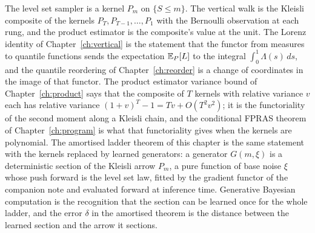 The level set sampler is a kernel $P_m$ on $\{ S \le m \}$. The vertical walk is the Kleisli composite of the kernels $P_T, P_{T-1}, \dots, P_1$ with the Bernoulli observation at each rung, and the product estimator is the composite's value at the unit. The Lorenz identity of Chapter~\ref{ch:vertical} is the statement that the functor from measures to quantile functions sends the expectation $\mathbb{E}_P[L]$ to the integral $\int_0^1 \Lambda(s) \, ds$, and the quantile reordering of Chapter~\ref{ch:reorder} is a change of coordinates in the image of that functor. The product estimator variance bound of Chapter~\ref{ch:product} says that the composite of $T$ kernels with relative variance $v$ each has relative variance $(1 + v)^T - 1 = T v + O(T^2 v^2)$; it is the functoriality of the second moment along a Kleisli chain, and the conditional FPRAS theorem of Chapter~\ref{ch:program} is what that functoriality gives when the kernels are polynomial. The amortised ladder theorem of this chapter is the same statement with the kernels replaced by learned generators: a generator $G(m, \xi)$ is a deterministic section of the Kleisli arrow $P_m$, a pure function of base noise $\xi$ whose push forward is the level set law, fitted by the gradient functor of the companion note and evaluated forward at inference time. Generative Bayesian computation is the recognition that the section can be learned once for the whole ladder, and the error $\delta$ in the amortised theorem is the distance between the learned section and the arrow it sections.

